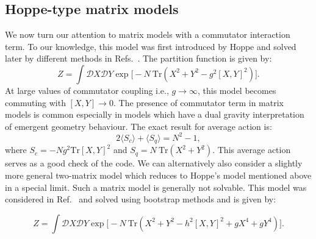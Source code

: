 \documentclass[letter,11pt]{article}
\begin{document}
\subsection{\label{subsec:Hoppe}Hoppe-type matrix models}
We now turn our attention to matrix models with a commutator interaction term. 
To our knowledge, this model 
was first introduced by Hoppe \cite{Hoppe:1982en} and solved later by different methods in 
Refs.~\cite{Kazakov:1998ji,Berenstein:2008eg}.
The partition function is given by:
\begin{equation}
Z = \int \mathcal{D}X \mathcal{D}Y \exp \Big[-N ~ \mbox{Tr} (X^2 + Y^2 - g^2 [X,Y]^2) \Big]. 
\end{equation}
At large values of commutator coupling i.e., $ g \to \infty$, this model becomes commuting with 
$ [X,Y] \to 0$. The presence of commutator term in matrix models is common especially in 
models which have a dual gravity interpretation of emergent geometry behaviour. 
The exact result for average action is:
\begin{equation}
	2 \langle S_{c} \rangle + \langle S_{q}  \rangle = N^2 - 1, 
\end{equation}
where $ S_{c} = -Ng^2 \mbox{Tr}[X,Y]^2$  and 
$ S_{q} = N~\mbox{Tr} (X^2 + Y^2)$.
This average action serves as a good check of the code. We can alternatively also consider a slightly more general two-matrix model which reduces to Hoppe's model mentioned above in a special limit. 
Such a matrix model is generally not solvable. This model was considered in Ref.~\cite{Kazakov:2021lel} and 
solved using bootstrap methods and is given by:

\begin{equation}
\label{eq:GHM1} 
Z = \int \mathcal{D}X \mathcal{D}Y \exp \Big[-N ~ \mbox{Tr} (X^2 + Y^2 - h^2 [X,Y]^2 + gX^4 + gY^4) \Big].	
\end{equation}
\end{document}
